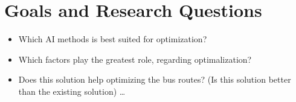 \section{Goals and Research Questions}

\begin{itemize}
  \item Which AI methods is best suited for optimization?
  \item Which factors play the greatest role, regarding optimalization?
  \item Does this solution help optimizing the bus routes? (Is this solution better than the existing solution)
   \ldots
\end{itemize}